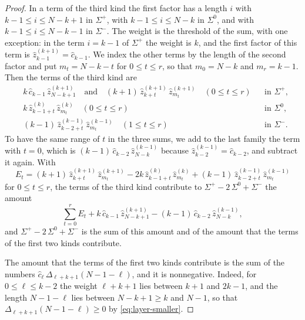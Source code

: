 \documentclass{amsart}
\theoremstyle{definition}
\theoremstyle{remark}
\numberwithin{equation}{section}
\begin{document}
\begin{proof}
In a term of the third kind the first factor has a length $i$ with $k-1\le i\le N-k+1$ in $\Sigma^{+}$, with $k-1\le i\le N-k$ in $\Sigma^{0}$, and with $k-1\le i\le N-k-1$ in $\Sigma^{-}$. The weight is the threshold of the sum, with one exception: in the term $i=k-1$ of $\Sigma^{+}$ the weight is $k$, and the first factor of this term is $\hat z^{(k+1)}_{k-1}=\hat c_{k-1}$. We index the other terms by the length of the second factor and put $m_t=N-k-t$ for $0\le t\le r$, so that $m_0=N-k$ and $m_r=k-1$. Then the terms of the third kind are
\begin{align*}
&k\,\hat c_{k-1}\,\hat z^{(k+1)}_{N-k+1}\quad\text{and}\quad(k+1)\,\hat z^{(k+1)}_{k+t}\,\hat z^{(k+1)}_{m_t}\quad(0\le t\le r)&&\text{in }\Sigma^{+},\\
&k\,\hat z^{(k)}_{k-1+t}\,\hat z^{(k)}_{m_t}\quad(0\le t\le r)&&\text{in }\Sigma^{0},\\
&(k-1)\,\hat z^{(k-1)}_{k-2+t}\,\hat z^{(k-1)}_{m_t}\quad(1\le t\le r)&&\text{in }\Sigma^{-}.
\end{align*}
To have the same range of $t$ in the three sums, we add to the last family the term with $t=0$, which is $(k-1)\,\hat c_{k-2}\,\hat z^{(k-1)}_{N-k}$ because $\hat z^{(k-1)}_{k-2}=\hat c_{k-2}$, and subtract it again. With
\[
E_t=(k+1)\,\hat z^{(k+1)}_{k+t}\,\hat z^{(k+1)}_{m_t}-2k\,\hat z^{(k)}_{k-1+t}\,\hat z^{(k)}_{m_t}+(k-1)\,\hat z^{(k-1)}_{k-2+t}\,\hat z^{(k-1)}_{m_t}
\]
for $0\le t\le r$, the terms of the third kind contribute to $\Sigma^{+}-2\,\Sigma^{0}+\Sigma^{-}$ the amount
\begin{equation}\label{eq:layer-middle}
\sum_{t=0}^{r}E_t+k\,\hat c_{k-1}\,\hat z^{(k+1)}_{N-k+1}-(k-1)\,\hat c_{k-2}\,\hat z^{(k-1)}_{N-k},
\end{equation}
and $\Sigma^{+}-2\,\Sigma^{0}+\Sigma^{-}$ is the sum of this amount and of the amount that the terms of the first two kinds contribute.

The amount that the terms of the first two kinds contribute is the sum of the numbers $\hat c_\ell\,\Delta_{\ell+k+1}(N-1-\ell)$, and it is nonnegative. Indeed, for $0\le\ell\le k-2$ the weight $\ell+k+1$ lies between $k+1$ and $2k-1$, and the length $N-1-\ell$ lies between $N-k+1\ge k$ and $N-1$, so that $\Delta_{\ell+k+1}(N-1-\ell)\ge 0$ by \eqref{eq:layer-smaller}.


\end{proof}
\end{document}
